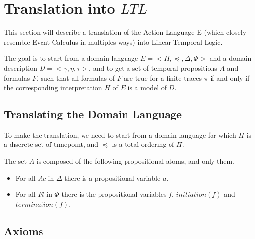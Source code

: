 \section{Translation into $LTL$}\label{sec:translation}

This section will describe a translation of the Action Language E (which closely resemble Event Calculus in multiples ways) into Linear Temporal Logic.

The goal is to start from a domain language $E=<\Pi,\preceq,\Delta,\Phi>$ and a domain description $D=<\gamma,\eta,\tau>$, and to get a set of temporal propositions $A$ and formulas $F$, such that all formulas of $F$ are true for a finite traces $\pi$ if and only if the corresponding interpretation $H$ of $E$ is a model of $D$.

\subsection{Translating the Domain Language}\label{sec:trans_dom_ltl}

To make the translation, we need to start from a domain language for which $\Pi$ is a discrete set of timepoint, and $\preceq$ is a total ordering of $\Pi$.

The set $A$ is composed of the following propositional atoms, and only them.

\begin{itemize}
  \item For all $Ac$ in $\Delta$ there is a propositional variable $a$.
  \item For all $Fl$ in $\Phi$ there is the propositional variables $f$, $initiation(f)$ and $termination(f)$.
\end{itemize}

\subsection{Axioms}\label{sec:trans_ax_ltl}

